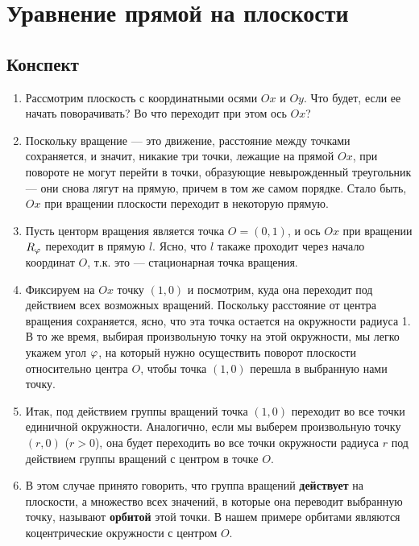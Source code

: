 
\section{Уравнение прямой на плоскости}

\subsection*{Конспект}

\begin{enumerate}
\item Рассмотрим плоскость с координатными осями $Ox$ и $Oy$. Что будет, если ее начать поворачивать? Во что переходит при этом ось $Ox$?
\item Поскольку вращение --- это движение, расстояние между точками сохраняется, и значит, никакие три точки, лежащие на прямой $Ox$, при повороте не могут перейти в точки, образующие невырожденный треугольник --- они снова лягут на прямую, причем в том же самом порядке. Стало быть, $Ox$ при вращении плоскости переходит в некоторую прямую.
\item Пусть центорм вращения является точка $O=(0,1)$, и ось $Ox$ при вращении $R_\varphi$ переходит в прямую $l$. Ясно, что $l$ такаже проходит через начало координат $O$, т.к. это --- стационарная точка вращения.
\item Фиксируем на $Ox$ точку $(1,0)$ и посмотрим, куда она переходит под действием всех возможных вращений. Поскольку расстояние от центра вращения сохраняется, ясно, что эта точка остается на окружности радиуса 1. В то же время, выбирая произвольную точку на этой окружности, мы легко укажем угол $\varphi$, на который нужно осуществить поворот плоскости относительно центра $O$, чтобы точка $(1,0)$ перешла в выбранную нами точку.
\item Итак, под действием группы вращений точка $(1,0)$ переходит во все точки единичной окружности. Аналогично, если мы выберем произвольную точку $(r,0)$ ($r>0$), она будет переходить во все точки окружности радиуса $r$ под действием группы вращений с центром в точке $O$.
\item В этом случае принято говорить, что группа вращений \textbf{действует} на плоскости, а множество всех значений, в которые она переводит выбранную точку, называют \textbf{орбитой} этой точки. В нашем примере орбитами являются коцентрические окружности с центром $O$.

\end{enumerate}
